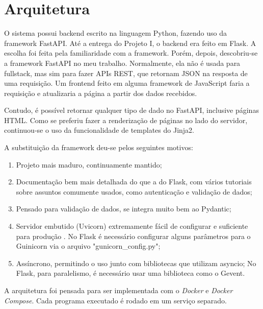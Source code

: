 \chapter{Arquitetura}

O sistema possui backend escrito na linguagem Python, 
fazendo uso da 
framework FastAPI. Até a entrega do Projeto I, o backend era feito em Flask. 
A escolha foi feita pela familiaridade com a framework. Porém, depois, 
descobriu-se a framework FastAPI no meu trabalho. Normalmente, ela não é usada para 
fullstack, mas sim para fazer APIs REST, que retornam JSON na resposta de uma 
requisição. Um frontend feito em alguma framework de JavaScript faria a requisição
 e atualizaria a página a partir dos dados recebidos.

Contudo, é possível retornar qualquer tipo de dado no FastAPI, inclusive páginas 
HTML. Como se preferiu fazer a renderização de páginas no lado do servidor, continuou-se
o uso da funcionalidade de templates do Jinja2.

A substituição da framework deu-se pelos seguintes motivos:

\begin{enumerate}
\item Projeto mais maduro, continuamente mantido;
\item Documentação bem mais detalhada do que a do Flask, com vários tutoriais sobre assuntos comumente usados, como autenticação e validação de dados;
\item Pensado para validação de dados, se integra muito bem ao Pydantic;
\item Servidor embutido (Uvicorn) extremamente fácil de configurar e suficiente para produção \cite{fast-api-prod}.
No Flask é necessário configurar alguns parâmetros para o Guinicorn via o arquivo "gunicorn\_config.py";
\item Assíncrono, permitindo o uso junto com bibliotecas que utilizam asyncio;
No Flask, para paralelismo, é necessário usar uma biblioteca como o Gevent.
\end{enumerate}

A arquitetura foi pensada para ser implementada com o \textit{Docker} e \textit{Docker Compose}. Cada
programa executado é rodado em um serviço separado.

